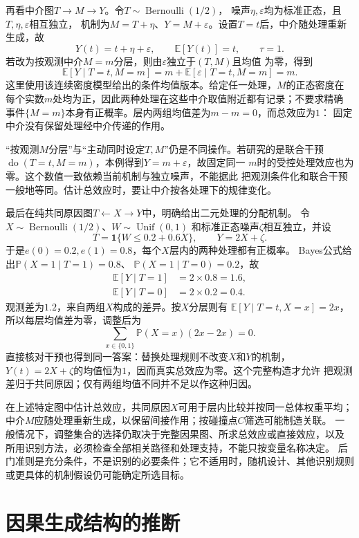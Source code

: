 再看中介图\(T\to M\to Y\)。令\(T\sim\operatorname{Bernoulli}(1/2)\)，
噪声\(\eta,\varepsilon\)均为标准正态，且\(T,\eta,\varepsilon\)相互独立，
机制为\(M=T+\eta\)、\(Y=M+\varepsilon\)。设置\(T=t\)后，中介随处理重新
生成，故
\[
  Y(t)=t+\eta+\varepsilon,\qquad
  \mathbb E[Y(t)]=t,\qquad \tau=1.
\]
若改为按观测中介\(M=m\)分层，则由\(\varepsilon\)独立于\((T,M)\)且均值
为零，得到
\[
  \mathbb E[Y\mid T=t,M=m]
  =m+\mathbb E[\varepsilon\mid T=t,M=m]=m.
\]
这里使用该连续密度模型给出的条件均值版本。给定任一处理，\(M\)的正态密度在
每个实数\(m\)处均为正，因此两种处理在这些中介取值附近都有记录；不要求精确
事件\(\{M=m\}\)本身有正概率。层内两组均值差为\(m-m=0\)，而总效应为\(1\)：
固定中介没有保留处理经中介传递的作用。

“按观测\(M\)分层”与“主动同时设定\(T,M\)”仍是不同操作。若研究的是联合干预
\(\operatorname{do}(T=t,M=m)\)，本例得到\(Y=m+\varepsilon\)，故固定同一
\(m\)时的受控处理效应也为零。这个数值一致依赖当前机制与独立噪声，不能据此
把观测条件化和联合干预一般地等同。估计总效应时，要让中介按各处理下的规律变化。

最后在纯共同原因图\(T\leftarrow X\to Y\)中，明确给出二元处理的分配机制。
令\(X\sim\operatorname{Bernoulli}(1/2)\)、\(W\sim\operatorname{Unif}(0,1)\)
和标准正态噪声\(\zeta\)相互独立，并设
\[
  T=\mathbf 1\{W\leq0.2+0.6X\},\qquad Y=2X+\zeta.
\]
于是\(e(0)=0.2,e(1)=0.8\)，每个\(X\)层内的两种处理都有正概率。
Bayes公式给出\(\mathbb P(X=1\mid T=1)=0.8\)、
\(\mathbb P(X=1\mid T=0)=0.2\)，故
\[
  \begin{aligned}
    \mathbb E[Y\mid T=1]&=2\times0.8=1.6,\\
    \mathbb E[Y\mid T=0]&=2\times0.2=0.4.
  \end{aligned}
\]
观测差为\(1.2\)，来自两组\(X\)构成的差异。按\(X\)分层则有
\(\mathbb E[Y\mid T=t,X=x]=2x\)，所以每层均值差为零，调整后为
\[
  \sum_{x\in\{0,1\}}\mathbb P(X=x)(2x-2x)=0.
\]
直接核对干预也得到同一答案：替换处理规则不改变\(X\)和\(Y\)的机制，
\(Y(t)=2X+\zeta\)的均值恒为\(1\)，因而真实总效应为零。这个完整构造才允许
把观测差归于共同原因；仅有两组均值不同并不足以作这种归因。

在上述特定图中估计总效应，共同原因\(X\)可用于层内比较并按同一总体权重平均；
中介\(M\)应随处理重新生成，以保留间接作用；按碰撞点\(C\)筛选可能制造关联。
一般情况下，调整集合的选择仍取决于完整因果图、所求总效应或直接效应，以及
所用识别方法，必须检查全部相关路径和处理支持，不能只按变量名称决定。
后门准则是充分条件，不是识别的必要条件；它不适用时，随机设计、其他识别规则
或更具体的机制假设仍可能确定所选目标。

\section{因果生成结构的推断}
\label{sec:causal-structure-discovery}

